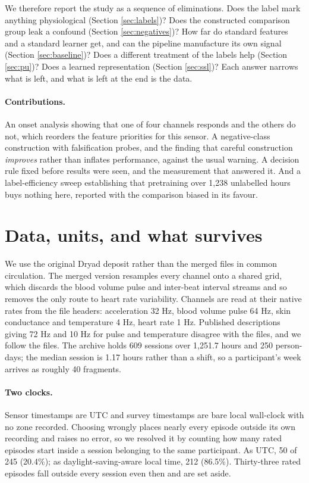We therefore report the study as a sequence of eliminations. Does the label
mark anything physiological (Section \ref{sec:labels})? Does the constructed
comparison group leak a confound (Section \ref{sec:negatives})? How far do
standard features and a standard learner get, and can the pipeline manufacture
its own signal (Section \ref{sec:baseline})? Does a different treatment of the
labels help (Section \ref{sec:pu})? Does a learned representation (Section
\ref{sec:ssl})? Each answer narrows what is left, and what is left at the end
is the data.

\paragraph{Contributions.} An onset analysis showing that one of four channels
responds and the others do not, which reorders the feature priorities for this
sensor. A negative-class construction with falsification probes, and the
finding that careful construction \emph{improves} rather than inflates
performance, against the usual warning. A decision rule fixed before results
were seen, and the measurement that answered it. And a label-efficiency sweep
establishing that pretraining over 1{,}238 unlabelled hours buys nothing here,
reported with the comparison biased in its favour.

\section{Data, units, and what survives}
\label{sec:data}

We use the original Dryad deposit rather than the merged files in common
circulation. The merged version resamples every channel onto a shared grid,
which discards the blood volume pulse and inter-beat interval streams and so
removes the only route to heart rate variability. Channels are read at their
native rates from the file headers: acceleration 32 Hz, blood volume pulse
64 Hz, skin conductance and temperature 4 Hz, heart rate 1 Hz. Published
descriptions giving 72 Hz and 10 Hz for pulse and temperature disagree with the
files, and we follow the files. The archive holds 609 sessions over 1{,}251.7
hours and 250 person-days; the median session is 1.17 hours rather than a
shift, so a participant's week arrives as roughly 40 fragments.

\paragraph{Two clocks.} Sensor timestamps are UTC and survey timestamps are
bare local wall-clock with no zone recorded. Choosing wrongly places nearly
every episode outside its own recording and raises no error, so we resolved it
by counting how many rated episodes start inside a session belonging to the
same participant. As UTC, 50 of 245 (20.4\%); as daylight-saving-aware local
time, 212 (86.5\%). Thirty-three rated episodes fall outside every session even
then and are set aside.

